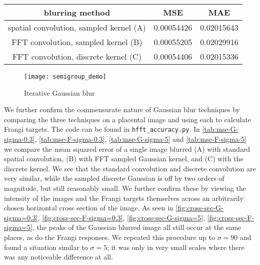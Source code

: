 \begin{table}
  \centering
  \begin{tabular}{c|cc}
   blurring method   & MSE & MAE \\
    \hline
spatial convolution, sampled kernel (A) & 0.00054426 & 0.02015643 \\
FFT convolution, sampled kernel (B) & 0.00055205 & 0.02029916 \\
FFT convolution, discrete kernel (C) & 0.00054406 & 0.02015336
    \end{tabular}
\end{table}


\begin{figure}
  \texttt{[image: semigroup\_demo]}
  \caption{Iterative Gaussian blur}
  \label{fig:semigroup-demo}
\end{figure}

We further confirm the commensurate nature of Gaussian blur techniques by comparing the three techniques on a placental image and using each to calculate Frangi targets. The code can be found in \texttt{hfft\_accuracy.py}. In \cref{tab:mse-G-sigma-0.3}, \cref{tab:mse-F-sigma-0.3}, \cref{tab:mse-G-sigma-5} and \cref{tab:mse-F-sigma-5} we compare the mean squared error of a single image blurred (A) with standard spatial convolution, (B) with FFT sampled Gaussian kernel, and (C) with the discrete kernel. We see that the standard convolution and discrete convolution are very similar, while the sampled discrete Gaussian is off by two orders of magnitude, but still reasonably small. We further confirm these by viewing the intensity of the images and the Frangi targets themselves across an arbitrarily chosen horizontal cross section of the image. As seen in \cref{fig:cross-sec-G-sigma=0.3}, \cref{fig:cross-sec-F-sigma=0.3},
\cref{fig:cross-sec-G-sigma=5}, \cref{fig:cross-sec-F-sigma=5}, the peaks of the Gaussian blurred image all still occur at the same places, as do the Frangi responses. We repeated this procedure up to $\sigma=90$ and found a situation similar to $\sigma=5$; it was only in very small scales where there was any noticeable difference at all.


